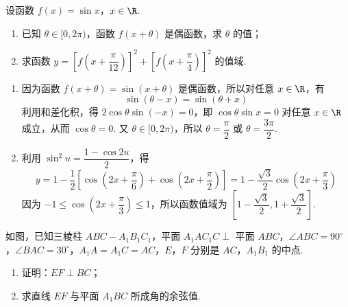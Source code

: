 \begin{problem}
设函数 \(f(x)=\sin x\)，\(x\in\R\).

\begin{enumerate}
  \item 已知 \(\theta\in[0,2\pi)\)，函数 \(f(x+\theta)\) 是偶函数，求 \(\theta\) 的值；
  \item 求函数 \(y=\left[f\left(x+\dfrac{\pi}{12}\right)\right]^2+\left[f\left(x+\dfrac{\pi}{4}\right)\right]^2\) 的值域.
\end{enumerate}
\end{problem}

\begin{solution}
\begin{enumerate}
\item 因为函数 \(f(x+\theta)=\sin(x+\theta)\) 是偶函数，所以对任意 \(x\in\R\)，有
\[
\sin(\theta-x)=\sin(\theta+x)
\]
利用和差化积，得 \(2\cos\theta\sin(-x)=0\)，即 \(\cos\theta\sin x=0\) 对任意 \(x\in\R\) 成立，从而 \(\cos\theta=0\). 又 \(\theta\in[0,2\pi)\)，所以 \(\theta=\dfrac{\pi}{2}\) 或 \(\theta=\dfrac{3\pi}{2}\).

\item 利用 \(\sin^2u=\dfrac{1-\cos2u}{2}\)，得
\[
y=1-\frac12\left[\cos\left(2x+\frac{\pi}{6}\right)+\cos\left(2x+\frac{\pi}{2}\right)\right]=1-\frac{\sqrt3}{2}\cos\left(2x+\frac{\pi}{3}\right)
\]
因为 \(-1\le\cos\left(2x+\dfrac{\pi}{3}\right)\le1\)，所以函数值域为 \(\left[1-\dfrac{\sqrt3}{2},1+\dfrac{\sqrt3}{2}\right]\).
\end{enumerate}
\end{solution}

\begin{problem}
如图，已知三棱柱 \(ABC-A_1B_1C_1\)，平面 \(A_1AC_1C\perp\) 平面 \(ABC\)，\(\angle ABC=90^\circ\)，\(\angle BAC=30^\circ\)，\(A_1A=A_1C=AC\)，\(E\)，\(F\) 分别是 \(AC\)，\(A_1B_1\) 的中点.

\begin{enumerate}
  \item 证明：\(EF\perp BC\)；
  \item 求直线 \(EF\) 与平面 \(A_1BC\) 所成角的余弦值.
\end{enumerate}

\end{problem}

